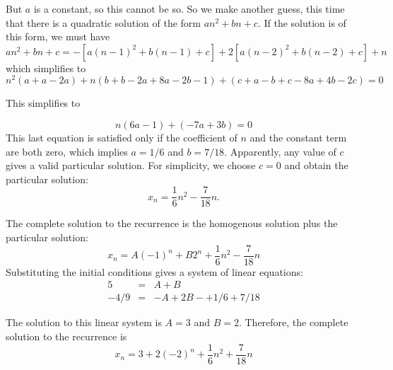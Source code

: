 \documentclass[12pt,twoside]{article}
\begin{document}
\begin{problem}{30}
\begin{problemparts}
{But $a$ is a constant, so this cannot be so.  
So we make another guess, this time that there is a quadratic solution of
the form $an^2 + bn +c$.  If the solution is of this form, we must have
\[
an^2 + bn + c = -[a(n-1)^2 + b(n-1) + c] + 2[a(n-2)^2 + b(n-2) + c] + n
\]
which simplifies to
\[
n^2(a + a - 2a) + n(b + b - 2a + 8a - 2b - 1) + (c + a - b + c - 8a + 4b - 2c) = 0
\]

This simplifies to

\[
	n(6a - 1) + (-7a + 3b) = 0
\]
This last equation is satisfied only if the coefficient of $n$ and the
constant term are both zero, which implies $a = 1/6$ and $b = 7/18$.
Apparently, any value of $c$ gives a valid particular solution.  For
simplicity, we choose $c = 0$ and obtain the particular solution:
\[
x_n = \frac{1}{6}n^2 - \frac{7}{18} n.
\]

The complete solution to the recurrence is the homogenous solution
plus the particular solution:
\[
x_n = A(-1)^n + B 2^n + \frac{1}{6}n^2 - \frac{7}{18} n
\]
Substituting the initial conditions gives a system of linear equations:
\begin{eqnarray*}
5	& = &	A + B \\
-4/9	& = &	-A + 2 B - + 1/6 + 7/18
\end{eqnarray*}

The solution to this linear system is $A = 3$ and $B = 2$.
Therefore, the complete solution to the recurrence is
\[
x_n =3+  2(-2)^{n} + \frac{1}{6}n^2 + \frac{7}{18} n 
\]
}

\end{problemparts}

\end{problem}
\end{document}
